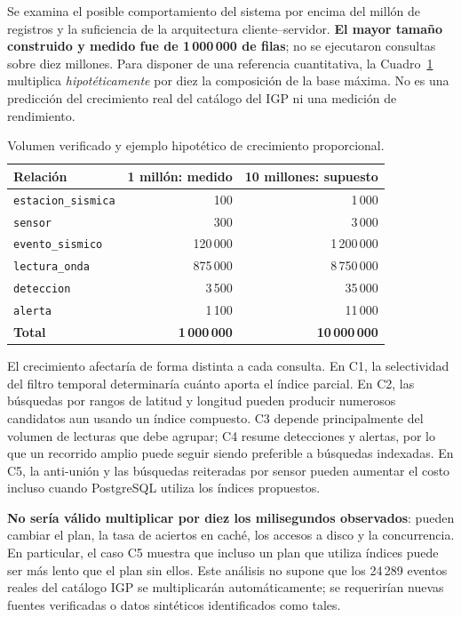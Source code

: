 \documentclass[12pt,a4paper]{article}
\begin{document}
Se examina el posible comportamiento del sistema por encima del millón
de registros y la suficiencia de la arquitectura
cliente--servidor. \textbf{El mayor tamaño construido y medido fue de
1\,000\,000 de filas}; no se ejecutaron consultas sobre diez millones.
Para disponer de una referencia cuantitativa, la
Cuadro~\ref{tab:extra-distribucion-10m} multiplica \emph{hipotéticamente}
por diez la composición de la base máxima. No es una predicción del
crecimiento real del catálogo del IGP ni una medición de rendimiento.

\begin{table}[H]
\centering\small
\begin{tabular}{lrr}
\toprule
\textbf{Relación} & \textbf{1 millón: medido} & \textbf{10 millones: supuesto} \\
\midrule
\texttt{estacion\_sismica} & 100 & 1\,000 \\
\texttt{sensor} & 300 & 3\,000 \\
\texttt{evento\_sismico} & 120\,000 & 1\,200\,000 \\
\texttt{lectura\_onda} & 875\,000 & 8\,750\,000 \\
\texttt{deteccion} & 3\,500 & 35\,000 \\
\texttt{alerta} & 1\,100 & 11\,000 \\
\midrule
\textbf{Total} & \textbf{1\,000\,000} & \textbf{10\,000\,000} \\
\bottomrule
\end{tabular}

\caption{Volumen verificado y ejemplo hipotético de crecimiento proporcional.}
\label{tab:extra-distribucion-10m}
\end{table}

El crecimiento afectaría de forma distinta a cada consulta. En C1,
la selectividad del filtro temporal determinaría cuánto aporta el
índice parcial. En C2, las búsquedas por rangos de latitud y longitud
pueden producir numerosos candidatos aun usando un índice compuesto.
C3 depende principalmente del volumen de lecturas que debe agrupar;
C4 resume detecciones y alertas, por lo que un recorrido amplio puede
seguir siendo preferible a búsquedas indexadas. En C5, la anti-unión
y las búsquedas reiteradas por sensor pueden aumentar el costo incluso
cuando PostgreSQL utiliza los índices propuestos.

\textbf{No sería válido multiplicar por diez los milisegundos
observados}: pueden cambiar el plan, la tasa de aciertos en caché,
los accesos a disco y la concurrencia. En particular, el caso C5
muestra que incluso un plan que utiliza índices puede ser más lento
que el plan sin ellos. Este análisis no supone que los 24\,289
eventos reales del catálogo IGP se multiplicarán automáticamente;
se requerirían nuevas fuentes verificadas o datos sintéticos
identificados como tales.
\end{document}
